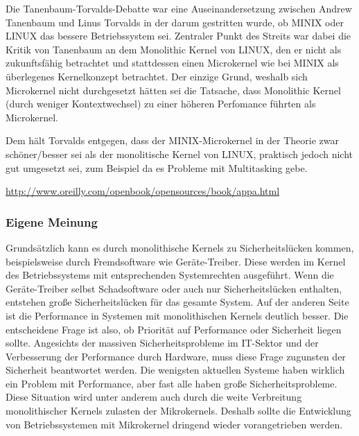 \documentclass[numbers=noendperiod]{scrartcl}
\begin{document}
Die Tanenbaum-Torvalds-Debatte war eine Auseinandersetzung zwischen Andrew Tanenbaum und Linus Torvalds in der darum gestritten wurde, ob MINIX oder LINUX das bessere Betriebssystem sei. Zentraler Punkt des Streits war dabei die Kritik von Tanenbaum an dem Monolithic Kernel von LINUX, den er nicht als zukunftsfähig betrachtet und stattdessen einen Microkernel wie bei MINIX als überlegenes Kernelkonzept betrachtet. Der einzige Grund, weshalb sich Microkernel nicht durchgesetzt hätten sei die Tatsache, dass Monolithic Kernel (durch weniger Kontextwechsel) zu einer höheren Perfomance führten als Microkernel.

Dem hält Torvalds entgegen, dass der MINIX-Microkernel in der Theorie zwar schöner/besser sei als der monolitische Kernel von LINUX, praktisch jedoch nicht gut umgesetzt sei, zum Beispiel da es Probleme mit Multitasking gebe.


\url{http://www.oreilly.com/openbook/opensources/book/appa.html}
\subsubsection*{Eigene Meinung}
	Grundsätzlich kann es durch monolithische Kernels zu Sicherheitslücken kommen, beispielsweise durch Fremdsoftware wie Geräte-Treiber. Diese werden im Kernel des Betriebssystems mit entsprechenden Systemrechten ausgeführt. Wenn die Geräte-Treiber selbst Schadsoftware oder auch nur Sicherheitslücken enthalten, entstehen große Sicherheitslücken für das gesamte System. Auf der anderen Seite ist die Performance in Systemen mit monolithischen Kernels deutlich besser. Die entscheidene Frage ist also, ob Priorität auf Performance oder Sicherheit liegen sollte. 
	Angesichts der massiven Sicherheitsprobleme im IT-Sektor und der Verbesserung der Performance durch Hardware, muss diese Frage zugunsten der Sicherheit beantwortet werden. Die wenigsten aktuellen Systeme haben wirklich ein Problem mit Performance, aber fast alle haben große Sicherheitsprobleme. Diese Situation wird unter anderem auch durch die weite Verbreitung monolithischer Kernels zulasten der Mikrokernels. Deshalb sollte die Entwicklung von Betriebssystemen mit Mikrokernel dringend wieder vorangetrieben werden.
\end{document}
